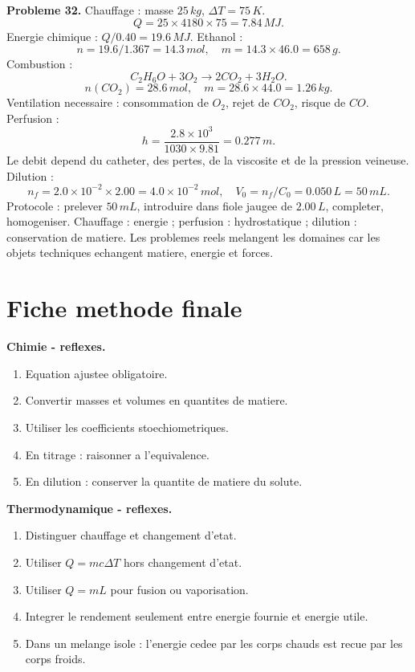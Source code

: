 \documentclass[11pt,a4paper]{article}
\begin{document}
\begin{corrige}
\textbf{Probleme 32.}
Chauffage : masse \(25\,kg\), \(\Delta T=75\,K\).
\[
Q=25\times4180\times75=7.84\,MJ.
\]
Energie chimique : \(Q/0.40=19.6\,MJ\). Ethanol :
\[
n=19.6/1.367=14.3\,mol,
\quad m=14.3\times46.0=658\,g.
\]
Combustion :
\[
C_2H_6O+3O_2\rightarrow2CO_2+3H_2O.
\]
\[
n(CO_2)=28.6\,mol,
\quad m=28.6\times44.0=1.26\,kg.
\]
Ventilation necessaire : consommation de \(O_2\), rejet de \(CO_2\), risque de \(CO\). Perfusion :
\[
h=\frac{2.8\times10^3}{1030\times9.81}=0.277\,m.
\]
Le debit depend du catheter, des pertes, de la viscosite et de la pression veineuse. Dilution :
\[
n_f=2.0\times10^{-2}\times2.00=4.0\times10^{-2}\,mol,
\quad V_0=n_f/C_0=0.050\,L=50\,mL.
\]
Protocole : prelever \(50\,mL\), introduire dans fiole jaugee de \(2.00\,L\), completer, homogeniser. Chauffage : energie ; perfusion : hydrostatique ; dilution : conservation de matiere. Les problemes reels melangent les domaines car les objets techniques echangent matiere, energie et forces.
\end{corrige}

\newpage


\section{Fiche methode finale}

\begin{retenir}
\textbf{Chimie - reflexes.}
\begin{enumerate}
\item Equation ajustee obligatoire.
\item Convertir masses et volumes en quantites de matiere.
\item Utiliser les coefficients stoechiometriques.
\item En titrage : raisonner a l'equivalence.
\item En dilution : conserver la quantite de matiere du solute.
\end{enumerate}
\end{retenir}

\begin{retenir}
\textbf{Thermodynamique - reflexes.}
\begin{enumerate}
\item Distinguer chauffage et changement d'etat.
\item Utiliser \(Q=mc\Delta T\) hors changement d'etat.
\item Utiliser \(Q=mL\) pour fusion ou vaporisation.
\item Integrer le rendement seulement entre energie fournie et energie utile.
\item Dans un melange isole : l'energie cedee par les corps chauds est recue par les corps froids.
\end{enumerate}
\end{retenir}
\end{document}
